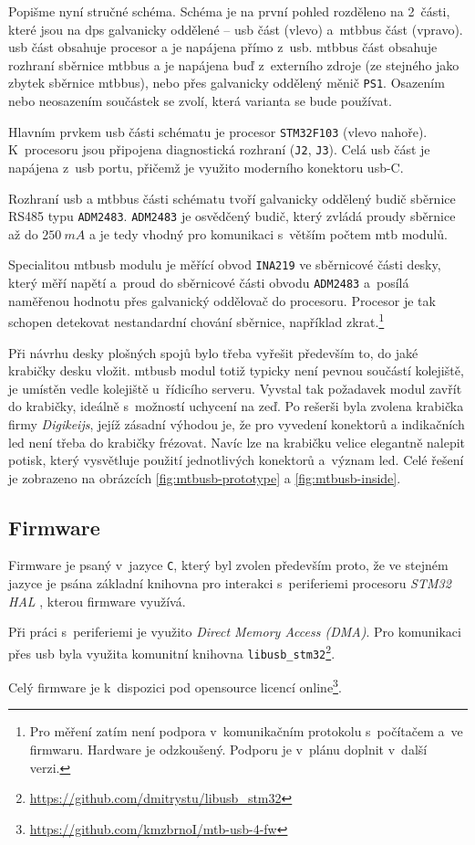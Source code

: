 Popišme nyní stručné schéma. Schéma je na první pohled rozděleno na 2~části,
které jsou na \gls{dps} galvanicky oddělené –
\gls{usb} část (vlevo) a~\gls{mtbbus} část (vpravo). \gls{usb} část obsahuje
procesor a je napájena přímo z~\gls{usb}. \gls{mtbbus} část obsahuje rozhraní
sběrnice \gls{mtbbus} a je napájena buď z~externího zdroje (ze stejného jako
zbytek sběrnice \gls{mtbbus}), nebo přes galvanicky oddělený měnič \texttt{PS1}.
Osazením nebo neosazením součástek se zvolí, která varianta se bude používat.

Hlavním prvkem \gls{usb} části schématu je procesor
\texttt{STM32F103} (vlevo nahoře). K~procesoru jsou připojena diagnostická
rozhraní (\texttt{J2}, \texttt{J3}). Celá \gls{usb} část je napájena z~\gls{usb}
portu, přičemž je využito moderního konektoru \gls{usb}-C.

Rozhraní \gls{usb} a \gls{mtbbus} části schématu tvoří galvanicky oddělený
budič sběrnice RS485 typu \texttt{ADM2483}. \texttt{ADM2483} je osvědčený budič,
který zvládá proudy sběrnice až do $250~mA$ \cite{adm2483-datasheet} a je tedy
vhodný pro komunikaci s~větším počtem \gls{mtb} modulů.

Specialitou \gls{mtbusb} modulu je měřící obvod \texttt{INA219} ve sběrnicové
části desky, který měří napětí a~proud do sběrnicové části obvodu
\texttt{ADM2483} a~posílá naměřenou hodnotu přes galvanický oddělovač do
procesoru. Procesor je tak schopen detekovat nestandardní chování sběrnice,
například zkrat.\footnote{Pro měření zatím není podpora v~komunikačním
protokolu s~počítačem a~ve firmwaru. Hardware je odzkoušený. Podporu je v~plánu
doplnit v~další verzi.}

Při návrhu desky plošných spojů bylo třeba vyřešit především to, do jaké
krabičky desku vložit. \gls{mtbusb} modul totiž typicky není pevnou součástí
kolejiště, je umístěn vedle kolejiště u~řídicího serveru. Vyvstal tak požadavek
modul zavřít do krabičky, ideálně s~možností uchycení na zeď. Po rešerši byla
zvolena krabička firmy \textit{Digikeijs}, jejíž zásadní výhodou je, že pro
vyvedení konektorů a indikačních \gls{led} není třeba do krabičky frézovat. Navíc lze
na krabičku velice elegantně nalepit potisk, který vysvětluje použití
jednotlivých konektorů a~význam \gls{led}. Celé řešení je zobrazeno na
obrázcích \ref{fig:mtbusb-prototype} a \ref{fig:mtbusb-inside}.


\subsection{Firmware}

Firmware je psaný v~jazyce \texttt{C}, který byl zvolen především proto, že ve
stejném jazyce je psána základní knihovna pro interakci s~periferiemi procesoru
\textit{STM32 HAL} \cite{stm32-hal}, kterou firmware využívá.

Při práci s~periferiemi je využito \textit{Direct Memory Access (DMA)}. Pro
komunikaci přes \gls{usb} byla využita komunitní knihovna
\texttt{libusb\_stm32}\footnote{\url{https://github.com/dmitrystu/libusb_stm32}}.

Celý firmware je k~dispozici pod opensource licencí
online\footnote{\url{https://github.com/kmzbrnoI/mtb-usb-4-fw}}.
